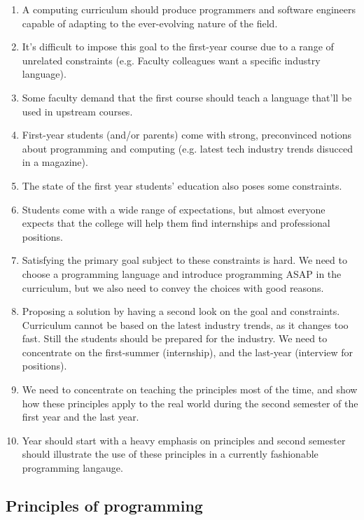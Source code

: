 \documentclass{article}
\begin{document}
\begin{enumerate}
\item A computing curriculum should produce programmers and software
  engineers capable of adapting to the ever-evolving nature of the
  field.
\item It's difficult to impose this goal to the first-year course due
  to a range of unrelated constraints (e.g. Faculty colleagues want a
  specific industry language).
\item Some faculty demand that the first course should teach a
  language that'll be used in upstream courses.
\item First-year students (and/or parents) come with strong,
  preconvinced notions about programming and computing (e.g. latest
  tech industry trends disucced in a magazine).
\item The state of the first year students' education also poses some
  constraints.
\item Students come with a wide range of expectations, but almost
  everyone expects that the college will help them find internships
  and professional positions.
\item Satisfying the primary goal subject to these constraints is
  hard. We need to choose a programming language and introduce
  programming ASAP in the curriculum, but we also need to convey the
  choices with good reasons.
\item Proposing a solution by having a second look on the goal and
  constraints. Curriculum cannot be based on the latest industry
  trends, as it changes too fast. Still the students should be
  prepared for the industry. We need to concentrate on the
  first-summer (internship), and the last-year (interview for
  positions).
\item We need to concentrate on teaching the principles most of the
  time, and show how these principles apply to the real world during
  the second semester of the first year and the last year.
\item Year should start with a heavy emphasis on principles and second
  semester should illustrate the use of these principles in a
  currently fashionable programming langauge.
\end{enumerate}

\subsection{Principles of programming}
\end{document}
